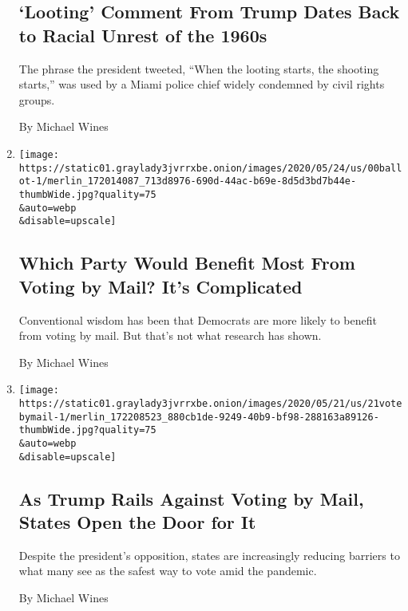 \begin{enumerate}
{  \subsection{`Looting' Comment From Trump Dates Back to Racial Unrest
  of the
  1960s}\label{looting-comment-from-trump-dates-back-to-racial-unrest-of-the-1960s}}

  The phrase the president tweeted, ``When the looting starts, the
  shooting starts,'' was used by a Miami police chief widely condemned
  by civil rights groups.

  By Michael Wines
\item
  \href{/2020/05/25/us/vote-by-mail-coronavirus.html}{}

  \texttt{[image: https://static01.graylady3jvrrxbe.onion/images/2020/05/24/us/00ballot-1/merlin\_172014087\_713d8976-690d-44ac-b69e-8d5d3bd7b44e-thumbWide.jpg?quality=75\\\&auto=webp\\\&disable=upscale]}

  \hypertarget{which-party-would-benefit-most-from-voting-by-mail-its-complicated}{%
  \subsection{Which Party Would Benefit Most From Voting by Mail? It's
  Complicated}\label{which-party-would-benefit-most-from-voting-by-mail-its-complicated}}

  Conventional wisdom has been that Democrats are more likely to benefit
  from voting by mail. But that's not what research has shown.

  By Michael Wines
\item
  \href{/2020/05/21/us/vote-by-mail-trump.html}{}

  \texttt{[image: https://static01.graylady3jvrrxbe.onion/images/2020/05/21/us/21votebymail-1/merlin\_172208523\_880cb1de-9249-40b9-bf98-288163a89126-thumbWide.jpg?quality=75\\\&auto=webp\\\&disable=upscale]}

  \hypertarget{as-trump-rails-against-voting-by-mail-states-open-the-door-for-it}{%
  \subsection{As Trump Rails Against Voting by Mail, States Open the
  Door for
  It}\label{as-trump-rails-against-voting-by-mail-states-open-the-door-for-it}}

  Despite the president's opposition, states are increasingly reducing
  barriers to what many see as the safest way to vote amid the pandemic.

  By Michael Wines
\end{enumerate}


